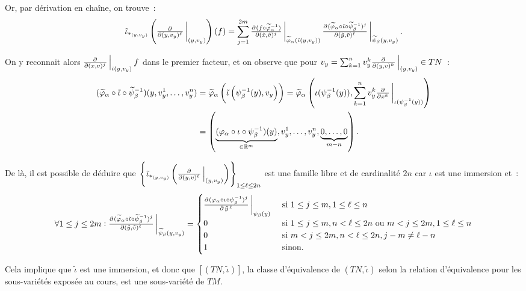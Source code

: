 \documentclass{article}
\newcommand{\R}{\mathbb R}
\begin{document}
Or, par dérivation en chaîne, on trouve~:
\[
	\tilde \iota_{*_{(y, v_y)}}\left(\pd {}{{(y, v_y)^\ell}}\sVert[3]_{(y, v_y)}\right)(f) =
		\sum_{j=1}^{2m}\pd {(f \circ \widetilde \varphi_\alpha^{-1})}{{(\tilde x, \tilde v)^j}}\sVert[3]_{\widetilde \varphi_\alpha (\tilde \iota(y, v_y))}
			\pd {(\widetilde \varphi_\alpha \circ \tilde \iota \circ \widetilde \psi_\beta^{-1})^j}{{(\tilde y, \tilde v)^\ell}}\sVert[3]_{\widetilde \psi_\beta(y, v_y)}.
\]

On y reconnait alors $\pd {}{{(x, v)^j}}\sVert[2]_{\tilde \iota(y, v_y)}f$ dans le premier facteur, et on observe que pour
$v_y = \sum_{k=1}^nv_y^k\pd {}{{(y, v)^k}}\sVert[2]_{(y, v_y)} \in TN$~:
\begin{align*}
(\widetilde \varphi_\alpha \circ \tilde \iota \circ \widetilde \psi_\beta^{-1})(y, v_y^1, \ldots, v_y^n)
	&= \widetilde \varphi_\alpha\left(\tilde \iota\left(\psi_\beta^{-1}(y), v_y\right)\right)
	= \widetilde \varphi_\alpha\left(\iota(\psi_\beta^{-1}(y)), \sum_{k=1}^nv_y^k\pd {}{{x^k}}\sVert[3]_{\iota(\psi_\beta^{-1}(y))}\right) \\
	&= \left(\underbrace {(\varphi_\alpha \circ \iota \circ \psi_\beta^{-1})(y)}_{\in \R^m}, v_y^1, \ldots, v_y^n, \underbrace {0, \ldots, 0}_{m-n}\right).
\end{align*}

De là, il est possible de déduire que $\left\{\tilde \iota_{*_{(y, v_y)}}\left(\pd {}{{(y, v)^\ell}}\sVert[2]_{(y, v_y)}\right)\right\}_{1 \leq \ell \leq 2n}$
est une famille libre et de cardinalité $2n$ car $\iota$ est une immersion et~:
\[
	\forall 1 \leq j \leq 2m : \pd {(\widetilde \varphi_\alpha \circ \tilde \iota \circ \widetilde \psi_\beta^{-1})^j}{{(\tilde y, \tilde v)^\ell}}\sVert[3]_{\widetilde \psi_\beta(y, v_y)}
	=
		\begin{cases}
			\pd {(\varphi_\alpha \circ \iota \circ \psi_\beta^{-1})^j}
			    {{\left.{\tilde y}\right.^\ell}}\sVert[3]_{\psi_\beta(y)} &\text{ si } 1 \leq j \leq m, 1 \leq \ell \leq n \\
			0 &\text{ si } 1 \leq j \leq m, n < \ell \leq 2n \text{ ou } m < j \leq 2m, 1 \leq \ell \leq n \\
			0 &\text{ si } m < j \leq 2m, n < \ell \leq 2n, j-m \neq \ell-n \\
			1 &\text{ sinon.}
		\end{cases}
\]

Cela implique que $\tilde \iota$ est une immersion, et donc que $[(TN, \tilde \iota)]$, la classe d'équivalence de $(TN, \tilde \iota)$ selon la relation d'équivalence
pour les sous-variétés exposée au cours, est une sous-variété de $TM$.
\end{document}
